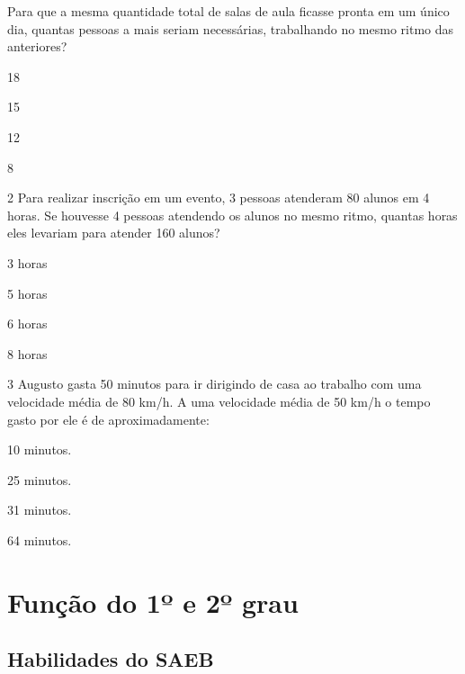 \begin{escolha}
\begin{escolha}
Para que a mesma quantidade total de salas de aula ficasse pronta em um
único dia, quantas pessoas a mais seriam necessárias, trabalhando no mesmo 
ritmo das anteriores?

\begin{escolha}

  \item 18

  \item 15

  \item 12

  \item 8

\end{escolha}

\num{2} Para realizar inscrição em um evento, 3 pessoas atenderam 80 alunos
em 4 horas. Se houvesse 4 pessoas atendendo os alunos no mesmo ritmo, quantas
horas eles levariam para atender 160 alunos?

\begin{escolha}
  \item 3 horas

  \item 5 horas

  \item 6 horas

  \item 8 horas
\end{escolha}

\num{3} Augusto gasta 50 minutos para ir dirigindo de casa ao trabalho com
uma velocidade média de 80 km/h. A uma velocidade média de 50 km/h o tempo
gasto por ele é de aproximadamente:

\begin{escolha}

  \item 10 minutos.

  \item 25 minutos.

  \item 31 minutos.

  \item 64 minutos.

\end{escolha}


\chapter{Função do 1º e 2º grau}

\section{Habilidades do SAEB}


\end{escolha}
\end{escolha}
